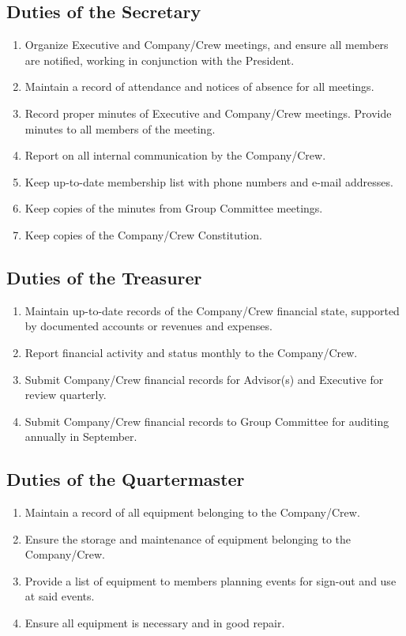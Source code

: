\subsection{Duties of the Secretary}\label{subsec:duties-of-the-secretary}
\begin{enumerate}
    \item Organize Executive and Company/Crew meetings, and ensure all members are notified, working in conjunction with the President.
    \item Maintain a record of attendance and notices of absence for all meetings.
    \item Record proper minutes of Executive and Company/Crew meetings.
    Provide minutes to all members of the meeting.
    \item Report on all internal communication by the Company/Crew.
    \item Keep up-to-date membership list with phone numbers and e-mail addresses.
    \item Keep copies of the minutes from Group Committee meetings.
    \item Keep copies of the Company/Crew Constitution.
\end{enumerate}

\subsection{Duties of the Treasurer}\label{subsec:duties-of-the-treasurer}
\begin{enumerate}
    \item Maintain up-to-date records of the Company/Crew financial state, supported by documented accounts or revenues and expenses.
    \item Report financial activity and status monthly to the Company/Crew.
    \item Submit Company/Crew financial records for Advisor(s) and Executive for review quarterly.
    \item Submit Company/Crew financial records to Group Committee for auditing annually in September.
\end{enumerate}

\subsection{Duties of the Quartermaster}\label{subsec:duties-of-the-quartermaster}
\begin{enumerate}
    \item Maintain a record of all equipment belonging to the Company/Crew.
    \item Ensure the storage and maintenance of equipment belonging to the Company/Crew.
    \item Provide a list of equipment to members planning events for sign-out and use at said events.
    \item Ensure all equipment is necessary and in good repair.
\end{enumerate}

